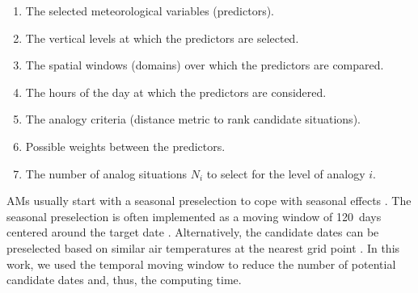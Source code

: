 \documentclass[draft]{agujournal2019}
\begin{document}
\begin{enumerate}		
	\item The selected meteorological variables (predictors).
	\item The vertical levels at which the predictors are selected.
	\item The spatial windows (domains) over which the predictors are compared.
	\item The hours of the day at which the predictors are considered.
	\item The analogy criteria (distance metric to rank candidate situations).
	\item Possible weights between the predictors.
	\item The number of analog situations $N_{i}$ to select for the level of analogy $i$.
\end{enumerate}

AMs usually start with a seasonal preselection to cope with seasonal effects \cite{Lorenz1969}. The seasonal preselection is often implemented as a moving window of 120~days centered around the target date \cite{Bontron2004, Marty2012, Horton2012, BenDaoud2016}. Alternatively, the candidate dates can be preselected based on similar air temperatures at the nearest grid point \cite[methods RM5 and RM6 in Table \ref{table:methods}]{BenDaoud2016}. In this work, we used the temporal moving window to reduce the number of potential candidate dates and, thus, the computing time.
\end{document}
